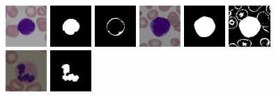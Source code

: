 \documentclass[final,a4paper,12pt,english]{UnicaPhdThesis3}
\begin{document}
\begin{figure}[h]
	\centering
	\hspace{-1.5mm}\includegraphics[width=0.14\textwidth]{images/2015_1_caip/3-1}\vspace{1 mm}
	\includegraphics[width=0.14\textwidth]{images/2015_1_caip/3-2}
	\includegraphics[width=0.14\textwidth]{images/2015_1_caip/3-3}
	\includegraphics[width=0.14\textwidth]{images/2015_1_caip/1-1}
	\includegraphics[width=0.14\textwidth]{images/2015_1_caip/1-2}
	\includegraphics[width=0.14\textwidth]{images/2015_1_caip/1-3}
	\includegraphics[width=0.14\textwidth]{images/2015_1_caip/2-1}
	\includegraphics[width=0.14\textwidth]{images/2015_1_caip/2-3}

\end{figure}
\end{document}
